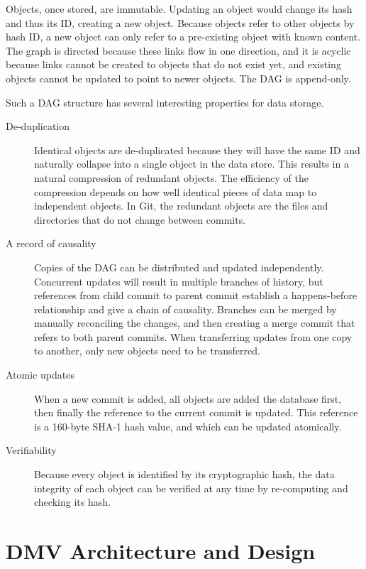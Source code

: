\documentclass[
    usenglish,
]{nik}
\begin{document}
Objects, once stored, are immutable.
Updating an object would change its hash and thus its ID, creating a new object.
Because objects refer to other objects by hash ID, a new object can only refer to a pre-existing object with known content.
The graph is directed because these links flow in one direction, and it is acyclic because links cannot be created to objects that do not exist yet, and existing objects cannot be updated to point to newer objects.
The DAG is append-only.

Such a DAG structure has several interesting properties for data storage.
\begin{description}
    \item[De-duplication]
        Identical objects are de-duplicated because they will have the same ID and naturally collapse into a single object in the data store.
        This results in a natural compression of redundant objects.
        The efficiency of the compression depends on how well identical pieces of data map to independent objects.
        In Git, the redundant objects are the files and directories that do not change between commits.
    \item[A record of causality]
        Copies of the DAG can be distributed and updated independently.
        Concurrent updates will result in multiple branches of history, but references from child commit to parent commit establish a happens-before relationship and give a chain of causality.
        Branches can be merged by manually reconciling the changes, and then creating a merge commit that refers to both parent commits.
        When transferring updates from one copy to another, only new objects need to be transferred.
    \item[Atomic updates]
        When a new commit is added, all objects are added the database first, then finally the reference to the current commit is updated.
        This reference is a 160-byte SHA-1 hash value, and which can be updated atomically.
    \item[Verifiability]
        Because every object is identified by its cryptographic hash, the data integrity of each object can be verified at any time by re-computing and checking its hash.
\end{description}



\section{DMV Architecture and Design}
\end{document}
